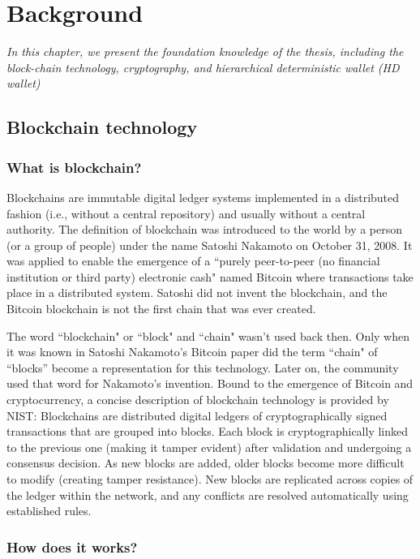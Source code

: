 \chapter{Background}
\label{chap:background}

\textit{In this chapter, we present the foundation knowledge of the thesis, including the block\hyp{}chain technology, cryptography, and hierarchical deterministic wallet (HD wallet)}

\minitoc

\section{Blockchain technology}
\label{blockchain}
\bigskip
\subsection{What is blockchain?}

Blockchains are immutable digital ledger systems implemented in a distributed fashion (i.e., without a central repository) and usually without a central authority. The definition of blockchain was introduced to the world by a person (or a group of people) under the name Satoshi Nakamoto on October 31, 2008. It was applied to enable the emergence of a ``purely peer-to-peer (no financial institution or third party) electronic cash" named Bitcoin where transactions take place in a distributed system. Satoshi did not invent the blockchain, and the Bitcoin blockchain is not the first chain that was ever created.

The word ``blockchain" or ``block" and ``chain" wasn't used back then. Only when it was known in Satoshi Nakamoto's Bitcoin paper did the term ``chain" of ``blocks” become a representation for this technology. Later on, the community used that word for Nakamoto's invention. Bound to the emergence of Bitcoin and cryptocurrency, a concise description of blockchain technology is provided by NIST: Blockchains are distributed digital ledgers of cryptographically signed transactions that are grouped into blocks. Each block is cryptographically linked to the previous one (making it tamper evident) after validation and undergoing a consensus decision. As new blocks are added, older blocks become more difficult to modify (creating tamper resistance). New blocks are replicated across copies of the ledger within the network, and any conflicts are resolved automatically using established rules.

\subsection{How does it works?}


